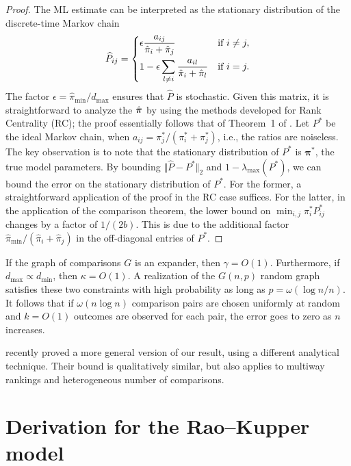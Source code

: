 \begin{proof}
The ML estimate can be interpreted as the stationary distribution of the discrete-time Markov chain
\begin{align}
\label{eq:mlchain}
  \widehat{P}_{ij} =
  \begin{dcases}
    \epsilon \frac{a_{ij}}{\hat{\pi}_i + \hat{\pi}_j}                    & \text{if } i \ne j, \\
    1 - \epsilon \sum_{l \ne i} \frac{a_{il}}{\hat{\pi}_i + \hat{\pi}_l} & \text{if } i = j.
  \end{dcases}
\end{align}
The factor $\epsilon = \hat{\pi}_{\min} / d_{\max}$ ensures that $\widehat{P}$ is stochastic.
Given this matrix, it is straightforward to analyze the $\hat{\bm{\pi}}$ by using the methods developed for Rank Centrality (RC);
the proof essentially follows that of Theorem~1 of \citet{negahban2017rank}.
Let $P^*$ be the ideal Markov chain, when  $a_{ij} = \pi^*_j / (\pi^*_i + \pi^*_j)$, i.e., the ratios are noiseless.
The key observation is to note that the stationary distribution of $P^*$ is $\bm{\pi}^*$, the true model parameters.
By bounding $\Vert \widehat{P} - P^* \Vert_2$ and $1 - \lambda_{\max}(P^*)$, we can bound the error on the stationary distribution of $P^*$.
For the former, a straightforward application of the proof in the RC case suffices.
For the latter, in the application of the comparison theorem, the lower bound on $\min_{i,j} \pi^*_i P^*_{ij}$ changes by a factor of $1/(2b)$.
This is due to the additional factor $\hat{\pi}_{\min} / (\hat{\pi}_i + \hat{\pi}_j)$ in the off-diagonal entries of $P^*$.
\end{proof}

If the graph of comparisons $G$ is an expander, then $\gamma = O(1)$.
Furthermore, if $d_{\max} \propto d_{\min}$, then $\kappa = O(1)$.
A realization of the $G(n, p)$ random graph satisfies these two constraints with high probability as long as $p = \omega(\log n / n)$.
It follows that if $\omega(n \log n)$ comparison pairs are chosen uniformly at random and $k = O(1)$ outcomes are observed for each pair, the error goes to zero as $n$ increases.

\citet{hajek2014minimax} recently proved a more general version of our result, using a different analytical technique.
Their bound is qualitatively similar, but also applies to multiway rankings and heterogeneous number of comparisons.

\section{Derivation for the Rao--Kupper model}

